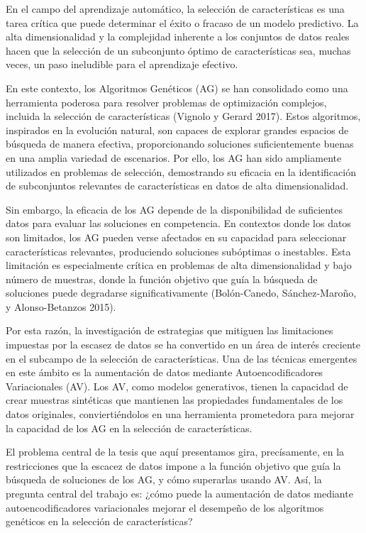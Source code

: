 
En el campo del aprendizaje automático, la selección de características es una tarea crítica que puede determinar el éxito o fracaso de un modelo predictivo. La alta dimensionalidad y la complejidad inherente a los conjuntos de datos reales hacen que la selección de un subconjunto óptimo de características sea, muchas veces, un paso ineludible para el aprendizaje efectivo.

En este contexto, los Algoritmos Genéticos (AG) se han consolidado como una herramienta poderosa para resolver problemas de optimización complejos, incluida la selección de características (Vignolo y Gerard 2017). Estos algoritmos, inspirados en la evolución natural, son capaces de explorar grandes espacios de búsqueda de manera efectiva, proporcionando soluciones suficientemente buenas en una amplia variedad de escenarios. Por ello, los AG han sido ampliamente utilizados en problemas de selección, demostrando su eficacia en la identificación de subconjuntos relevantes de características en datos de alta dimensionalidad.

Sin embargo, la eficacia de los AG depende de la disponibilidad de suficientes datos para evaluar las soluciones en competencia. En contextos donde los datos son limitados, los AG pueden verse afectados en su capacidad para seleccionar características relevantes, produciendo soluciones subóptimas o inestables. Esta limitación es especialmente crítica en problemas de alta dimensionalidad y bajo número de muestras, donde la función objetivo que guía la búsqueda de soluciones puede degradarse significativamente (Bolón-Canedo, Sánchez-Maroño, y Alonso-Betanzos 2015).

Por esta razón, la investigación de estrategias que mitiguen las limitaciones impuestas por la escasez de datos se ha convertido en un área de interés creciente en el subcampo de la selección de características. Una de las técnicas emergentes en este ámbito es la aumentación de datos mediante Autoencodificadores Variacionales (AV). Los AV, como modelos generativos, tienen la capacidad de crear muestras sintéticas que mantienen las propiedades fundamentales de los datos originales, conviertiéndolos en una herramienta prometedora para mejorar la capacidad de los AG en la selección de características.

El problema central de la tesis que aquí presentamos gira, precísamente, en la restricciones que la escacez de datos impone a la función objetivo que guía la búsqueda de soluciones de los AG, y cómo superarlas usando AV. Así, la pregunta central del trabajo es: ¿cómo puede la aumentación de datos mediante autoencodificadores variacionales mejorar el desempeño de los algoritmos genéticos en la selección de características?

